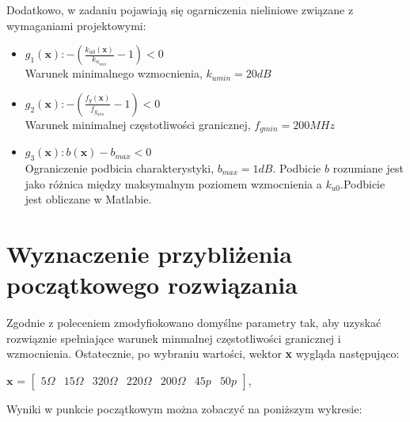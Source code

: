 \documentclass{article}
\begin{document}
Dodatkowo, w zadaniu pojawiają się ogarniczenia nieliniowe związane z wymaganiami projektowymi:\\
\begin{itemize}
	\item \(g_1(\textbf{x}): -(\frac{k_{u0}(\textbf{x})}{k_{u_{min}}}-1) <  0\) \\ Warunek minimalnego wzmocnienia, $k_{umin}=20dB$
	\item \(g_2(\textbf{x}): -(\frac{{f_g}(\textbf{x})}{f_{g_{min}}}-1)<0\) \\ Warunek minimalnej częstotliwości granicznej, $f_{gmin}=200 MHz$
	\item \(g_3(\textbf{x}): b(\textbf{x})-b_{max}<0\) \\ Ograniczenie podbicia charakterystyki, $b_{max}=1dB$. Podbicie $b$ rozumiane jest jako różnica między maksymalnym poziomem wzmocnienia a $k_{u0}$.Podbicie jest obliczane w Matlabie.

\end{itemize}


\section{Wyznaczenie przybliżenia początkowego rozwiązania}
Zgodnie z poleceniem zmodyfiokowano domyślne parametry tak, aby uzyskać rozwiąznie spełniające warunek minmalnej częstotliwości granicznej i wzmocnienia.
Ostatecznie, po wybraniu wartości, wektor \textbf{x} wygląda następująco:
\begin{center}
	$\textbf{x}$ =
	$\begin{bmatrix}
			5\Omega & 15\Omega & 320\Omega & 220\Omega & 200\Omega & 45p & 50p
		\end{bmatrix}$,
\end{center}

Wyniki w punkcie początkowym można zobaczyć na poniższym wykresie:
\end{document}
